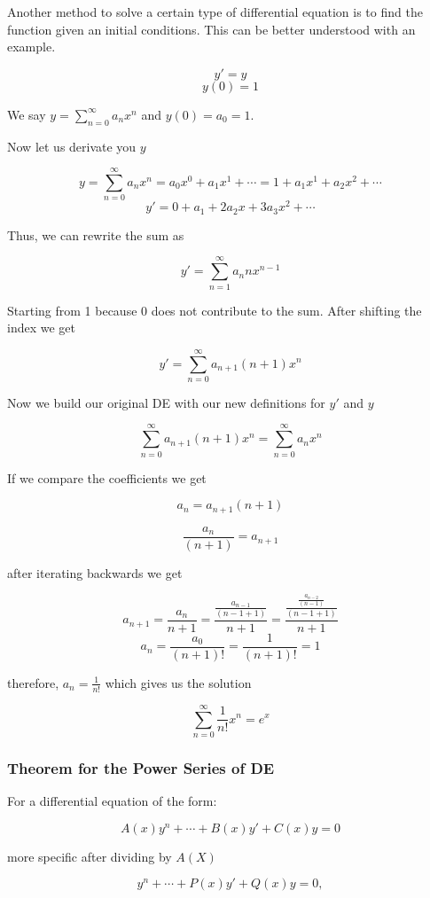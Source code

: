 Another method to solve a certain type  of differential equation
is to find the function given an initial conditions. This can be better understood with an example.

\[
    y' = y
\]
\[
    y(0) = 1
\]

We say \(y = \sum_{n = 0}^{\infty} a_n x^n\) and \(y(0) = a_0 = 1\).

Now let us derivate you \(y\)

\[
    y = \sum_{n = 0}^{\infty} a_n x^n = a_0 x^0 + a_1 x^1 + \cdots = 1 + a_1 x^1 + a_2 x^2 + \cdots
\]
\[
    y' = 0  + a_1 + 2 a_2 x + 3 a_3 x^2 + \cdots 
\]

Thus, we can rewrite the sum as 

\[
    y' = \sum_{n = 1}^{\infty} a_n n x^{n - 1}
\]

Starting from 1 because 0 does not contribute to the sum. After shifting the index we get

\[
    y' = \sum_{n = 0}^{\infty} a_{n + 1}(n + 1)x^{n}
\]

Now we build our original DE with our new definitions for \(y'\) and \(y\)

\[
    \sum_{n = 0}^{\infty} a_{n + 1}(n + 1)x^{n} = \sum_{n = 0}^{\infty} a_n x^n
\]

If we compare the coefficients we get

\[
    a_n = a_{n+1}(n+1)
\]

\[
    \frac{a_n}{(n + 1)} = a_{n+1}
\]

after iterating backwards we get

\[
    a_{n + 1} = \frac{a_n}{n + 1} = \frac{\frac{a_{n - 1}}{(n - 1 +1)}}{n + 1} = 
    \frac{\frac{\frac{a_{n - 2}}{(n - 1)}}{(n - 1 + 1)}}{n + 1}   
\]
\[
    a_n = \frac{a_0}{(n + 1)!} = \frac{1}{(n + 1)!} = 1
\]

therefore, \(a_n = \frac{1}{n!}\) which gives us the solution

\[
    \sum_{n = 0}^{\infty}\frac{1}{n!}x^n = e^x
\]

\subsubsection{Theorem for the Power Series of DE}

For a differential equation of the form:

\[
    A(x)y^{n} + \cdots + B(x)y' + C(x)y = 0
\]

more specific after dividing by \(A(X)\)

\[
    y^{n} + \cdots + P(x)y' + Q(x)y = 0,
\]


